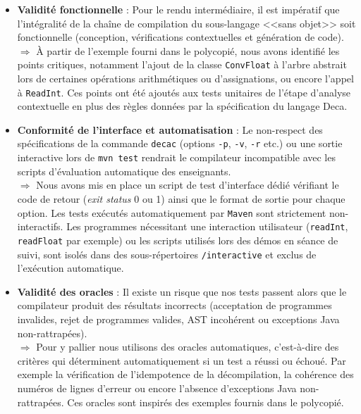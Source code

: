 \begin{itemize}[label=$\circ$]
    \item \textbf{Validité fonctionnelle} : Pour le rendu intermédiaire, il est impératif que l'intégralité de la chaîne de compilation du sous-langage <<sans objet>> soit fonctionnelle (conception, vérifications contextuelles et génération de code).
    \\ $\Rightarrow$ À partir de l'exemple fourni dans le polycopié, nous avons identifié les points critiques, notamment l'ajout de la classe \texttt{ConvFloat} à l'arbre abstrait lors de certaines opérations arithmétiques ou d'assignations, ou encore l'appel à \texttt{ReadInt}. Ces points ont été ajoutés aux tests unitaires de l'étape d'analyse contextuelle en plus des règles données par la spécification du langage Deca.

    \item \textbf{Conformité de l'interface et automatisation} : Le non-respect des spécifications de la commande \texttt{decac} (options \texttt{-p}, \texttt{-v}, \texttt{-r} etc.) ou une sortie interactive lors de \texttt{mvn test} rendrait le compilateur incompatible avec les scripts d'évaluation automatique des enseignants.
    \\ $\Rightarrow$ Nous avons mis en place un script de test d'interface dédié vérifiant le code de
    retour (\textit{exit status} 0 ou 1) ainsi que le format de sortie pour chaque option. Les tests exécutés automatiquement par \texttt{Maven} sont strictement non-interactifs. Les programmes nécessitant une interaction utilisateur (\texttt{readInt}, \texttt{readFloat} par exemple) ou les scripts utilisés lors des démos en séance de suivi, sont isolés dans des sous-répertoires \texttt{/interactive} et exclus de l'exécution automatique.

    \item \textbf{Validité des oracles} : Il existe un risque que nos tests passent alors que le compilateur produit des résultats incorrects (acceptation de programmes invalides, rejet de programmes valides, AST incohérent ou exceptions Java non-rattrapées).  
    \\ $\Rightarrow$ Pour y pallier nous utilisons des oracles automatiques, c'est-à-dire des critères qui déterminent automatiquement si un test a réussi ou échoué. Par exemple la vérification de l'idempotence de la décompilation, la cohérence des numéros de lignes d'erreur ou encore l'absence d'exceptions Java non-rattrapées. Ces oracles sont inspirés des exemples fournis dans le polycopié.


\end{itemize}
